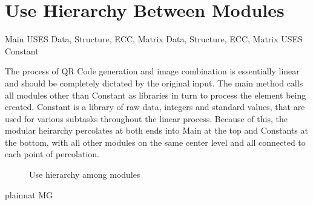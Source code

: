 \documentclass[12pt, titlepage]{article}
\begin{document}
\section{Use Hierarchy Between Modules} \label{SecUse}

Main USES Data, Structure, ECC, Matrix
Data, Structure, ECC, Matrix USES Constant

The process of QR Code generation and image combination is essentially linear 
and should be completely dictated by the original input. The main method calls 
all modules other than Constant as libraries in turn to process the element being
created. Constant is a library of raw data, integers and standard values, that 
are used for various subtasks throughout the linear process. Because of this, the 
modular heirarchy percolates at both ends into Main at the top and Constants at 
the bottom, with all other modules on the same center level and all connected 
to each point of percolation.

\begin{figure}[H]
\centering
\caption{Use hierarchy among modules}
\label{FigUH}
\end{figure}


 {plainnat}
 {MG}
\end{document}
